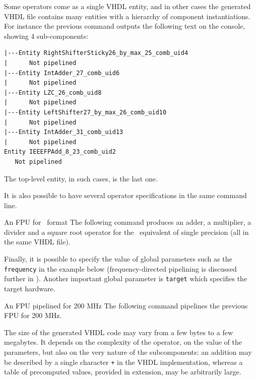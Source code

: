 \documentclass{article}
\begin{document}
Some operators come as a single VHDL entity, and in other cases the generated VHDL file contains many entities with a hierarchy of component instantiations.
For instance the previous command outputs the following text on the console, showing 4 sub-components:

\begin{small}
\begin{verbatim}
|---Entity RightShifterSticky26_by_max_25_comb_uid4
|      Not pipelined
|---Entity IntAdder_27_comb_uid6
|      Not pipelined
|---Entity LZC_26_comb_uid8
|      Not pipelined
|---Entity LeftShifter27_by_max_26_comb_uid10
|      Not pipelined
|---Entity IntAdder_31_comb_uid13
|      Not pipelined
Entity IEEEFPAdd_8_23_comb_uid2
   Not pipelined
\end{verbatim}  
\end{small}
The top-level entity, in such cases, is the last one.

It is also possible to have several operator specifications in the same command line.
\begin{flopocobox}{An FPU for \Float\ format}
  The following command produces an adder, a multiplier, a divider and a square root operator for the \Float\ equivalent of single precision (all in the same VHDL file).
  
\end{flopocobox}

Finally, it is possible to specify the value of global parameters such as the \texttt{frequency} in the example below (frequency-directed pipelining is discussed further in ).
Another important global parameter is \texttt{target} which specifies the target hardware.


\begin{flopocobox}{An FPU pipelined for 200 MHz}
  The following command pipelines the previous FPU for  200 MHz.
  
\end{flopocobox}


\medskip

The size of the generated VHDL code may vary from a few bytes to a few megabytes.
It depends on the complexity of the operator, on the value of the parameters, but also on the very nature of the subcomponents: an addition may be described by a single character \texttt{+} in the VHDL implementation, whereas a table of precomputed values, provided in extension, may be arbitrarily large.
\end{document}
